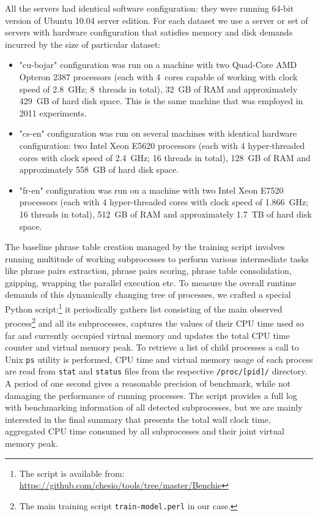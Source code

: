 All the servers had identical software configuration:
they were running 64-bit version of Ubuntu 10.04 server edition.
For each dataset we use a server or set of servers with hardware configuration
that satisfies memory and disk demands incurred by the size of particular dataset:
\begin{itemize}
  \item "cu-bojar" configuration was run on a machine with two Quad-Core
  AMD Opteron\texttrademark{} 2387 processors (each with 4~cores capable of working
  with clock speed of 2.8~GHz; 8~threads in total),
  32~GB of RAM and approximately 429~GB of hard disk space. %
  This is the same machine that was employed in 2011 experiments.
  \item "cs-en" configuration was run on several machines with identical hardware
  configuration: two Intel\textregistered{} Xeon\textregistered{} E5620
  processors
  (each with 4 hyper-threaded cores with clock speed of 2.4~GHz; 16 threads in total),
  128~GB of RAM and approximately 558~GB of hard disk space. %
  \item "fr-en" configuration was run on a machine with two Intel\textregistered{}
  Xeon\textregistered{} E7520
  processors
  (each with 4 hyper-threaded cores with clock speed of 1.866~GHz; 16 threads in total),
  512~GB of RAM and approximately 1.7~TB of hard disk space. %
\end{itemize}

The baseline phrase table creation managed by the training script involves
running multitude of working subprocesses to perform various intermediate
tasks like phrase pairs extraction, phrase pairs scoring, phrase table
consolidation, gzipping, wrapping the parallel execution etc.
To measure the overall runtime demands of this dynamically changing tree
of processes, we crafted a special Python script:\footnote{The script is available
from: \url{https://github.com/chesio/tools/tree/master/Benchie}}
it periodically gathers list consisting of the main observed
process\footnote{The main training script \texttt{train-model.perl} in our case.}
and all its subprocesses, captures the values of their CPU time used so far
and currently occupied virtual memory and updates the total CPU time counter
and virtual memory peak.
To retrieve a list of child processes a call to Unix \verb|ps| utility is
performed, CPU time and virtual memory usage of each process are read from
\verb|stat| and \verb|status| files from the respective \verb|/proc/[pid]/|
directory.
A period of one second gives a reasonable precision of benchmark, while
not damaging the performance of running processes.
The script provides a full log with benchmarking information of all detected
subprocesses, but we are mainly interested in the final summary that presents
the total wall clock time, aggregated CPU time consumed by all subprocesses
and their joint virtual memory peak.

